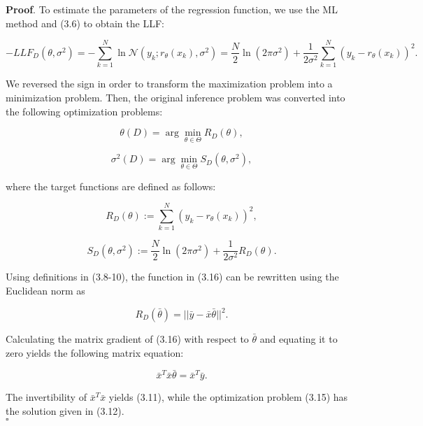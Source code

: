 \documentclass{report}
\begin{document}
\textbf{Proof}. To estimate the parameters of the regression function, we use the ML method and (3.6) to obtain the LLF:

\begin{equation}
-LLF_{D}(\theta,\sigma^2)=-\sum_{k=1}^N\ln\mathcal{N}(y_k;r_\theta(x_k),\sigma^2)=\frac{N}{2}\ln(2\pi\sigma^2)+\frac{1}{2\sigma^2}\sum_{k=1}^N(y_k-r_\theta(x_k))^2.
\end{equation}

We reversed the sign in order to transform the maximization problem into a minimization problem. Then, the original inference problem was converted into the following optimization problems:

\begin{equation}
\theta(D) = \arg\min_{\theta \in \Theta} R_{D}(\theta),
\end{equation}

\begin{equation}
\sigma^2(D) = \arg\min_{\theta \in \Theta} S_{D}(\theta, \sigma^2),
\end{equation}

where the target functions are defined as follows:

\begin{equation}
R_{D}(\theta) := \sum_{k=1}^N(y_k-r_\theta(x_k))^2,
\end{equation}

\begin{equation}
S_{D}(\theta,\sigma^2) := \frac{N}{2}\ln(2\pi\sigma^2)+\frac{1}{2\sigma^2}R_{D}(\theta).
\end{equation}

Using definitions in (3.8-10), the function in (3.16) can be rewritten using the Euclidean norm as

\begin{equation}
R_{D}(\bar{\theta}) = ||\bar{y} -\bar{x}\bar{\theta}||^2.
\end{equation}

Calculating the matrix gradient of (3.16) with respect to $\bar{\theta}$ and equating it to zero yields the following matrix equation:

\begin{equation}
\bar{x}^T\bar{x}\bar{\theta} = \bar{x}^T\bar{y}.
\end{equation}

The invertibility of $\bar{x}^T\bar{x}$ yields (3.11), while the optimization problem (3.15) has the solution given in (3.12).\\
$\square$\\
\end{document}
